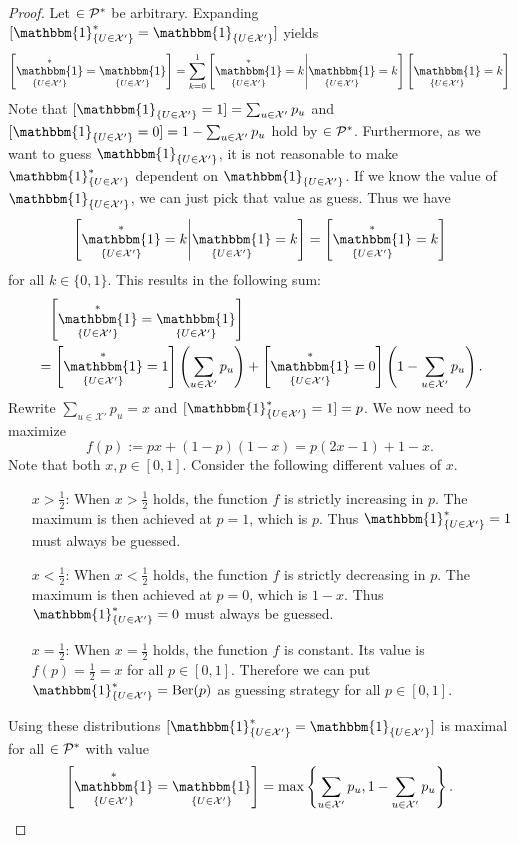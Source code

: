 \documentclass[a4paper]{report}
\theoremstyle{plain}
\theoremstyle{definition}
\theoremstyle{remark}
\numberwithin{equation}{chapter}
\let\P\relax
\DeclareMathOperator{\P}{\mathbb{P}}
\DeclareMathOperator{\1}{\mathbbm{1}}
\newcommand{\X}{\mathcal{X}}
\newcommand{\Pmod}{\mathcal{P}^*}
\newcommand{\GeneralGenInd}{\1_{\{U\in\X'\}}}
\begin{document}
\begin{proof}
Let $\P\in\Pmod$ be arbitrary. Expanding $\P[\GeneralGenInd^*=\GeneralGenInd]$ yields
\begin{equation}
\P\left[\GeneralGenInd^*=\GeneralGenInd\right]=\sum_{k=0}^1\P\left[\GeneralGenInd^*=k\middle|\GeneralGenInd=k\right]\P\left[\GeneralGenInd=k\right]
\end{equation}
Note that $\P[\GeneralGenInd=1]=\sum_{u\in\X'}p_u$ and $\P[\GeneralGenInd=0]=1-\sum_{u\in\X'}p_u$ hold by $\P\in\Pmod$. Furthermore, as we want to guess $\GeneralGenInd$, it is not reasonable to make $\GeneralGenInd^*$ dependent on $\GeneralGenInd$. If we know the value of $\GeneralGenInd$, we can just pick that value as guess. Thus we have
\begin{equation}
\P\left[\GeneralGenInd^*=k\middle|\GeneralGenInd=k\right]=\P\left[\GeneralGenInd^*=k\right]
\end{equation}
for all $k\in\{0,1\}$. This results in the following sum:
\begin{align}
&\phantom{=}\P\left[\GeneralGenInd^*=\GeneralGenInd\right]\nonumber\\
&=\P\left[\GeneralGenInd^*=1\right]\left(\sum_{u\in\X'}p_u\right)+\P\left[\GeneralGenInd^*=0\right]\left(1-\sum_{u\in\X'}p_u\right).
\end{align}
Rewrite $\sum_{u\in\X'}p_u=x$ and $\P[\GeneralGenInd^*=1]=p$. We now need to maximize
\begin{equation}
f(p):=px+(1-p)(1-x)=p(2x-1)+1-x.
\end{equation}
Note that both $x,p\in[0,1]$. Consider the following different values of $x$.
\begin{itemize}
    \item[$x>\frac{1}{2}$:] When $x>\frac{1}{2}$ holds, the function $f$ is strictly increasing in $p$. The maximum is then achieved at $p=1$, which is $p$. Thus $\1_{\{U\in\X'\}}^*=1$ must always be guessed.
    \item[$x<\frac{1}{2}$:] When $x<\frac{1}{2}$ holds, the function $f$ is strictly decreasing in $p$. The maximum is then achieved at $p=0$, which is $1-x$. Thus $\1_{\{U\in\X'\}}^*=0$ must always be guessed.
    \item[$x=\frac{1}{2}$:] When $x=\frac{1}{2}$ holds, the function $f$ is constant. Its value is $f(p)=\frac{1}{2}=x$ for all $p\in[0,1]$. Therefore we can put $\GeneralGenInd^*=\mathrm{Ber}(p)$ as guessing strategy for all $p\in[0,1]$.
\end{itemize}
Using these distributions $\P[\GeneralGenInd^*=\GeneralGenInd]$ is maximal for all $\P\in\Pmod$ with value 
\begin{equation}
\P\left[\GeneralGenInd^*=\GeneralGenInd\right]=\max\left\{\sum_{u\in\X'}p_u,1-\sum_{u\in\X'}p_u\right\}.
\end{equation}
\end{proof}
\end{document}
